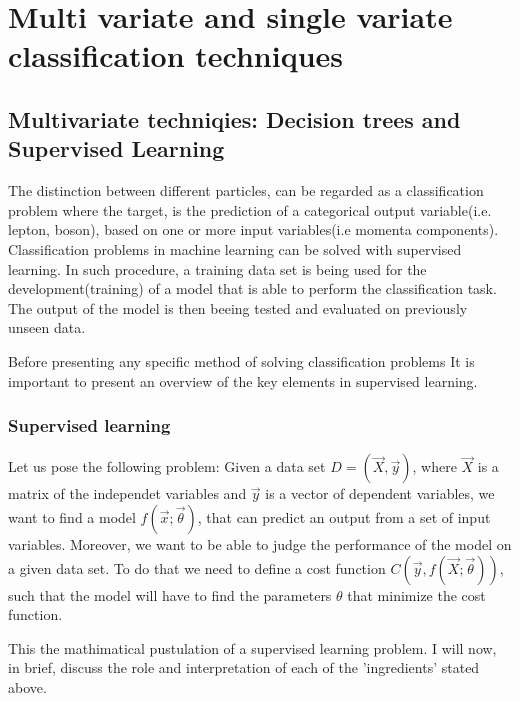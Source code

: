 \section{Multi variate and single variate classification techniques}
\label{sec:org6d2a2d0}
\subsection{Multivariate techniqies: Decision trees and Supervised Learning}
\label{sec:orgbbc6149}
The distinction between different particles, can be regarded as a classification problem where the target, is the prediction of a categorical output variable(i.e. lepton, boson), based on one or more input variables(i.e momenta components). Classification problems in  machine learning can be solved with supervised learning. In such procedure, a training data set is being used for the development(training) of a model that is able to perform the classification task. The output of the model is then beeing tested and evaluated on previously unseen data.

Before presenting any specific method of solving classification problems It is important to present an overview of the key elements in supervised learning.

\subsubsection{Supervised learning}
\label{sec:org0051e97}
Let us pose the following problem:
Given a data set \(D= (\vec{X}, \vec{y})\), where \(\vec{X}\) is a matrix of the independet variables and \(\vec{y}\) is a vector of dependent variables, we want to find a model \(f(\vec{x} ; \vec{\theta})\),  that can predict an output from a set of input variables. Moreover, we  want to be able to judge the performance of the model on a given data set. To do that we need to define a cost function \(C(\vec{y}, f(\vec{X}; \vec{\theta}))\), such that the model will have to find the parameters \(\theta\) that minimize the cost function.\cite{Mehta_2019}

This the mathimatical pustulation of a supervised learning problem. I will now, in brief, discuss the role and interpretation of each of the 'ingredients' stated above.

